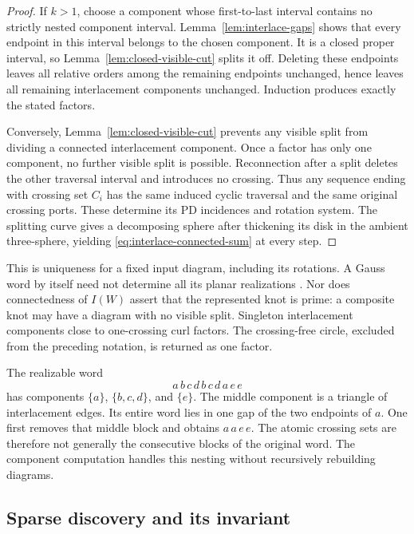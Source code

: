 \begin{proof}
If $k>1$, choose a component whose first-to-last interval contains no strictly
nested component interval.  Lemma~\ref{lem:interlace-gaps} shows that every
endpoint in this interval belongs to the chosen component.  It is a closed
proper interval, so Lemma~\ref{lem:closed-visible-cut} splits it off.  Deleting
these endpoints leaves all relative orders among the remaining endpoints
unchanged, hence leaves all remaining interlacement components unchanged.
Induction produces exactly the stated factors.

Conversely, Lemma~\ref{lem:closed-visible-cut} prevents any visible split
from dividing a connected interlacement component.  Once a factor has only
one component, no further visible split is possible.  Reconnection after
a split deletes the other traversal interval and introduces no crossing.
Thus any sequence ending with crossing set $C_i$ has the same induced
cyclic traversal and the same original crossing ports.  These determine its
PD incidences and rotation system.  The splitting curve gives a decomposing
sphere after thickening its disk in the ambient three-sphere, yielding
\eqref{eq:interlace-connected-sum} at every step.
\end{proof}

This is uniqueness for a fixed input diagram, including its rotations.
A Gauss word by itself need not determine all its planar realizations
\cite{courcelle}.  Nor does connectedness of $I(W)$ assert that the represented
knot is prime: a composite knot may have a diagram with no visible split.
Singleton interlacement components close to one-crossing curl factors.
The crossing-free circle, excluded from the preceding notation, is returned
as one factor.

\begin{remark}
The realizable word
\[
a\,b\,c\,d\,b\,c\,d\,a\,e\,e
\]
has components $\{a\}$, $\{b,c,d\}$, and $\{e\}$.  The middle component is a
triangle of interlacement edges.  Its entire word lies in one gap of the
two endpoints of $a$.  One first removes that middle block and obtains
$a\,a\,e\,e$.  The atomic crossing sets are therefore not generally the
consecutive blocks of the original word.  The component computation handles
this nesting without recursively rebuilding diagrams.
\end{remark}

\subsection{Sparse discovery and its invariant}

